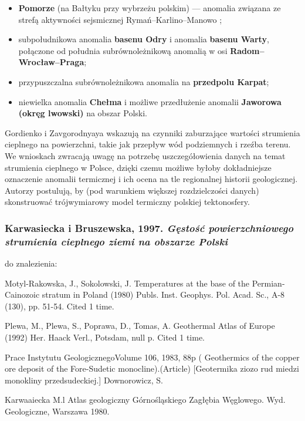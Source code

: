 \documentclass[11.5pt,twoside]{report}
\newcommand{\ct}[1]{\ignorespaces} %
\begin{document}
\begin{itemize}
\item \textbf{Pomorze} (na Bałtyku przy wybrzeżu polskim) --- anomalia związana ze strefą aktywności sejsmicznej Rymań--Karlino--Manowo \ct{Karlin czy Karlino? - spr. w Pagaczewski};
\item subpołudnikowa anomalia \textbf{basenu Odry} i anomalia \textbf{basenu Warty}, połączone od południa subrównoleżnikową anomalią w osi \textbf{Radom--Wrocław--Praga};
\item przypuszczalna subrównoleżnikowa anomalia na \textbf{przedpolu Karpat};
\item niewielka anomalia \textbf{Chełma} i możliwe przedłużenie anomalii \textbf{Jaworowa (okręg lwowski)} na obszar Polski. 
\end{itemize}

Gordienko i Zavgorodnyaya wskazują na czynniki zaburzające wartości strumienia cieplnego na powierzchni, takie jak przepływ wód podziemnych i rze\'{z}ba terenu. We wnioskach zwracają uwagę na potrzebę uszczegółowienia danych na temat strumienia cieplnego w Polsce, dzięki czemu możliwe byłoby dokładniejsze oznaczenie anomalii termicznej i ich ocena na tle regionalnej historii geologicznej. Autorzy postulują, by (pod warunkiem większej rozdzielczości danych) skonstruować trójwymiarowy model termiczny polskiej tektonosfery.

\subsubsection{Karwasiecka i Bruszewska, 1997. \textit{Gęstość powierzchniowego strumienia cieplnego ziemi na obszarze Polski}}

\iffalse
do znalezienia: 

Motyl-Rakowska, J., Sokolowski, J.
Temperatures at the base of the Permian-Cainozoic stratum in Poland
(1980) Publs. Inst. Geophys. Pol. Acad. Sc., A-8 (130), pp. 51-54. Cited 1 time.


Plewa, M., Plewa, S., Poprawa, D., Tomas, A.
Geothermal Atlas of Europe
(1992) Her. Haack Verl., Potsdam, null p. Cited 1 time.

 Prace Instytutu GeologicznegoVolume 106, 1983, 88p
( Geothermics of the copper ore deposit of the Fore-Sudetic monocline).(Article)
[Geotermika ziozo rud miedzi monokliny przedsudeckiej.]
Downorowicz, S. 

 Karwaaiecka M.l  Atlas geologiczny Górnośląskiego  Zagłębia Węglowego. 
Wyd.  Geologiczne,  Warszawa  1980.
\end{document}
